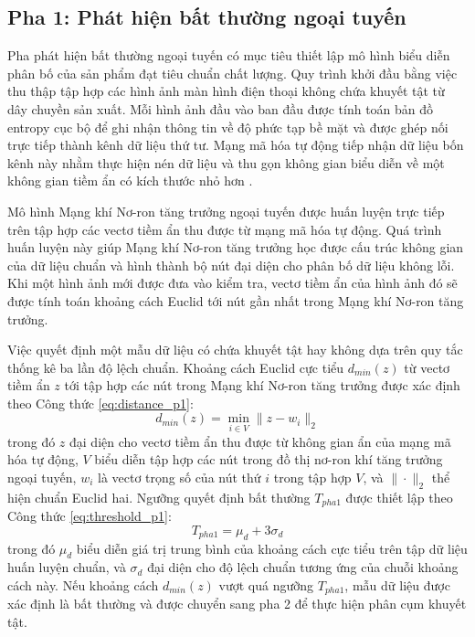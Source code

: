 \subsection{Pha 1: Phát hiện bất thường ngoại tuyến}
\label{subsec:pha1_overview}

Pha phát hiện bất thường ngoại tuyến có mục tiêu thiết lập mô hình biểu diễn phân bố của sản phẩm đạt tiêu chuẩn chất lượng. Quy trình khởi đầu bằng việc thu thập tập hợp các hình ảnh màn hình điện thoại không chứa khuyết tật từ dây chuyền sản xuất. Mỗi hình ảnh đầu vào ban đầu được tính toán bản đồ entropy cục bộ để ghi nhận thông tin về độ phức tạp bề mặt và được ghép nối trực tiếp thành kênh dữ liệu thứ tư. Mạng mã hóa tự động tiếp nhận dữ liệu bốn kênh này nhằm thực hiện nén dữ liệu và thu gọn không gian biểu diễn về một không gian tiềm ẩn có kích thước nhỏ hơn \cite{hinton2006reducing}.

Mô hình Mạng khí Nơ-ron tăng trưởng ngoại tuyến được huấn luyện trực tiếp trên tập hợp các vectơ tiềm ẩn thu được từ mạng mã hóa tự động. Quá trình huấn luyện này giúp Mạng khí Nơ-ron tăng trưởng học được cấu trúc không gian của dữ liệu chuẩn và hình thành bộ nút đại diện cho phân bố dữ liệu không lỗi. Khi một hình ảnh mới được đưa vào kiểm tra, vectơ tiềm ẩn của hình ảnh đó sẽ được tính toán khoảng cách Euclid tới nút gần nhất trong Mạng khí Nơ-ron tăng trưởng.

Việc quyết định một mẫu dữ liệu có chứa khuyết tật hay không dựa trên quy tắc thống kê ba lần độ lệch chuẩn. Khoảng cách Euclid cực tiểu $d_{min}(z)$ từ vectơ tiềm ẩn $z$ tới tập hợp các nút trong Mạng khí Nơ-ron tăng trưởng được xác định theo Công thức \ref{eq:distance_p1}:
\begin{equation}
\label{eq:distance_p1}
d_{min}(z) = \min_{i \in V} \| z - w_i \|_2
\end{equation}
trong đó $z$ đại diện cho vectơ tiềm ẩn thu được từ không gian ẩn của mạng mã hóa tự động, $V$ biểu diễn tập hợp các nút trong đồ thị nơ-ron khí tăng trưởng ngoại tuyến, $w_i$ là vectơ trọng số của nút thứ $i$ trong tập hợp $V$, và $\| \cdot \|_2$ thể hiện chuẩn Euclid hai. Ngưỡng quyết định bất thường $T_{pha1}$ được thiết lập theo Công thức \ref{eq:threshold_p1}:
\begin{equation}
\label{eq:threshold_p1}
T_{pha1} = \mu_d + 3 \sigma_d
\end{equation}
trong đó $\mu_d$ biểu diễn giá trị trung bình của khoảng cách cực tiểu trên tập dữ liệu huấn luyện chuẩn, và $\sigma_d$ đại diện cho độ lệch chuẩn tương ứng của chuỗi khoảng cách này. Nếu khoảng cách $d_{min}(z)$ vượt quá ngưỡng $T_{pha1}$, mẫu dữ liệu được xác định là bất thường và được chuyển sang pha 2 để thực hiện phân cụm khuyết tật.

